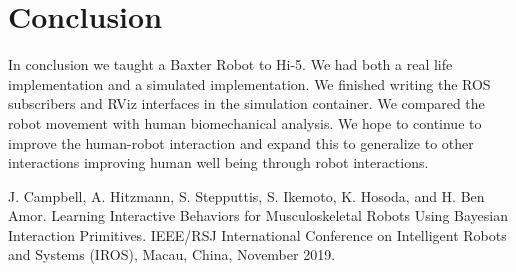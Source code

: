 \documentclass[letterpaper, 10 pt, conference]{ieeeconf}  %
\begin{document}
\section{Conclusion}
In conclusion we taught a Baxter Robot to Hi-5. We had both a real life implementation and a simulated implementation. We finished writing the ROS subscribers and RViz interfaces in the simulation container. We compared the robot movement with human biomechanical analysis. We hope to continue to improve the human-robot interaction and expand this to generalize to other interactions improving human well being through robot interactions.

\addtolength{\textheight}{-12cm}   %








\begin{thebibliography}{99}
 J. Campbell, A. Hitzmann, S. Stepputtis, S. Ikemoto, K. Hosoda, and H. Ben Amor. Learning Interactive Behaviors for Musculoskeletal Robots Using Bayesian Interaction Primitives. IEEE/RSJ International Conference on Intelligent Robots and Systems (IROS), Macau, China, November 2019.
\end{thebibliography}
\end{document}
